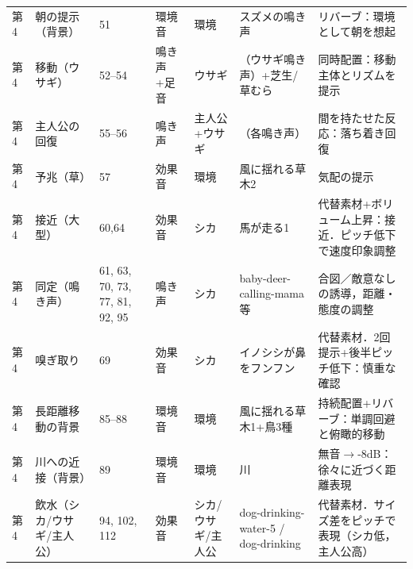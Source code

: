 \begin{longtable}{p{0.6cm} p{2.8cm} p{1.6cm} p{1.5cm} p{1.5cm} p{3.0cm} p{4.1cm}}
	第4          & 朝の提示（背景）             & 51                      & 環境音         & 環境            & スズメの鳴き声                                   & リバーブ：環境として朝を想起                               \\
	第4          & 移動（ウサギ）              & 52--54                  & 鳴き声+足音      & ウサギ           & （ウサギ鳴き声）+芝生/草むら                           & 同時配置：移動主体とリズムを提示                             \\
	第4          & 主人公の回復               & 55--56                  & 鳴き声         & 主人公+ウサギ       & （各鳴き声）                                    & 間を持たせた反応：落ち着き回復                              \\
	第4          & 予兆（草）                & 57                      & 効果音         & 環境            & 風に揺れる草木2                                  & 気配の提示                                        \\
	第4          & 接近（大型）               & 60,64                   & 効果音         & シカ            & 馬が走る1                                     & 代替素材+ボリューム上昇：接近．ピッチ低下で速度印象調整                 \\
	第4          & 同定（鳴き声）              & 61, 63, 70, 73, 77, 81, 92, 95 & 鳴き声         & シカ            & baby-deer-calling-mama 等                  & 合図／敵意なしの誘導，距離・態度の調整                          \\
	第4          & 嗅ぎ取り                 & 69                      & 効果音         & シカ            & イノシシが鼻をフンフン                               & 代替素材．2回提示+後半ピッチ低下：慎重な確認                      \\
	第4          & 長距離移動の背景             & 85--88                  & 環境音         & 環境            & 風に揺れる草木1+鳥3種                              & 持続配置+リバーブ：単調回避と俯瞰的移動                         \\
	第4          & 川への近接（背景）            & 89                      & 環境音         & 環境            & 川                                         & 無音$\to$-8dB：徐々に近づく距離表現                       \\
	第4          & 飲水（シカ/ウサギ/主人公）       & 94, 102, 112              & 効果音         & シカ/ウサギ/主人公    & dog-drinking-water-5 / dog-drinking       & 代替素材．サイズ差をピッチで表現（シカ低，主人公高）                   \\

\end{longtable}
